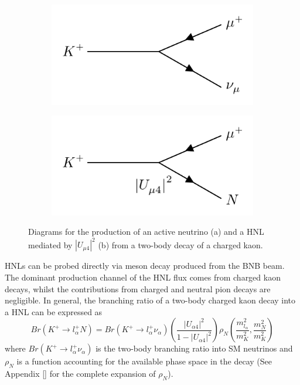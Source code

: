 \begin{figure}[htbp!]
\begin{subfigure}[h]{0.4\linewidth}
\centering    
\includegraphics[width=\linewidth]{kaon_to_SMnu}
\caption{}
\end{subfigure}
\hfill
\begin{subfigure}[h]{0.4\linewidth}
\centering    
\includegraphics[width=\linewidth]{kaon_to_HNL}
\caption{}
\end{subfigure}%
\caption[kaonDiagram]{
Diagrams for the production of an active neutrino (a) and a HNL mediated by $|U_{\mu4}|^{2}$ (b) from a two-body decay of a charged kaon.
}\label{fig:kaonDiagram}
\end{figure}

HNLs can be probed directly via meson decay produced from the BNB beam.
The dominant production channel of the HNL flux comes from charged kaon decays, whilst the contributions from charged and neutral pion decays are negligible. 
In general, the branching ratio of a two-body charged kaon decay into a HNL can be expressed as 
\begin{equation}
	Br(K^{+}\rightarrow l^{+}_{\alpha}N) = Br(K^{+}\rightarrow l^{+}_{\alpha}\nu_{\alpha})\left(\frac{|U_{\alpha 4}|^{2}}{1 - |U_{\alpha 4}|^{2}}\right)\rho_{N}\left(\frac{m^{2}_{l_{\alpha}}}{m^{2}_{K}}, \frac{m^{2}_{N}}{m^{2}_{K}} \right) 
\end{equation}
where $Br(K^{+}\rightarrow l^{+}_{\alpha}\nu_{\alpha})$ is the two-body branching ratio into SM neutrinos and $\rho_{N}$ is a function accounting for the available phase space in the decay \cite{} (See Appendix \ref{} for the complete expansion of $\rho_{N}$).

